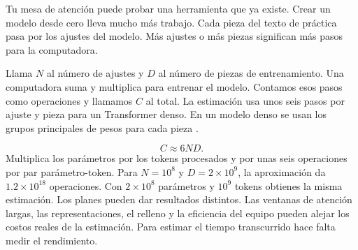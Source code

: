 {Tu mesa de atención puede probar una herramienta que ya existe. Crear un modelo desde cero lleva mucho más trabajo. Cada pieza del texto de práctica pasa por los ajustes del modelo. Más ajustes o más piezas significan más pasos para la computadora.

\moremath
Llama \(N\) al número de ajustes y \(D\) al número de piezas de entrenamiento. Una computadora suma y multiplica para entrenar el modelo. Contamos esos pasos como operaciones y llamamos \(C\) al total. La estimación usa unos seis pasos por ajuste y pieza para un Transformer denso. En un modelo denso se usan los grupos principales de pesos para cada pieza \citep{hoffmann}.}
\begin{equation}
 C\approx 6ND .
 \label{eq:compute}
\end{equation}
{Multiplica los parámetros por los tokens procesados y por unas seis operaciones por par parámetro-token. Para \(N=10^8\) y \(D=2\times10^9\), la aproximación da \(1.2\times10^{18}\) operaciones. Con \(2\times10^8\) parámetros y \(10^9\) tokens obtienes la misma estimación. Los planes pueden dar resultados distintos. Las ventanas de atención largas, las representaciones, el relleno y la eficiencia del equipo pueden alejar los costos reales de la estimación. Para estimar el tiempo transcurrido hace falta medir el rendimiento.}

